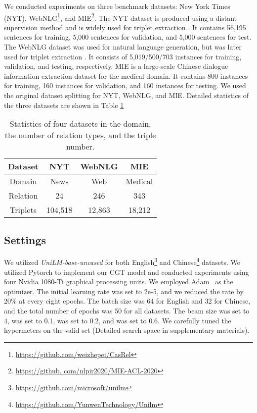\documentclass[letterpaper]{article} \usepackage{aaai21}  \usepackage{times}  \usepackage{helvet} \usepackage{courier}  \usepackage[hyphens]{url}  \usepackage{graphicx} \urlstyle{rm} \def\UrlFont{\rm}  \usepackage{natbib}  \usepackage[noend]{algpseudocode}
\begin{document}
We conducted experiments on three benchmark datasets: New York Times (NYT), WebNLG\footnote{\url{https://github.com/weizhepei/CasRel}}, and MIE\footnote{\url{https://github. com/nlpir2020/MIE-ACL-2020}}. The NYT dataset is produced using a distant supervision method and is widely used for triplet extraction \cite{riedel2010modeling}.  It contains 56,195 sentences for training, 5,000 sentences for validation, and 5,000 sentences for test. The WebNLG dataset \cite{gardent2017creating} was used for natural language generation, but was later used for triplet extraction \cite{zeng2018extracting}. It consists of 5,019/500/703 instances for training, validation, and testing, respectively. MIE \cite{zhang2020mie} is a large-scale Chinese dialogue information extraction dataset for the medical domain. It contains 800 instances for training, 160 instances for validation, and 160 instances for testing. We used the original dataset splitting for NYT, WebNLG, and MIE. Detailed statistics of the three datasets are shown in Table \ref{dataset}
\begin{table}[!htbp]
 
\centering
{
\begin{tabular}{c|ccc}

\toprule
Dataset&NYT&WebNLG&MIE\\
\midrule
Domain&News&Web&Medical\\
Relation&24&246&343\\
Triplets&104,518&12,863&18,212\\
\bottomrule
\end{tabular}
}
\caption{Statistics of four datasets in the domain, the number of relation types, and the triple number.}
\label{dataset}
\end{table}

\subsection{Settings}
We utilized \emph{UniLM-base-uncased} for both English\footnote{\url{https://github.com/microsoft/unilm}} and Chinese\footnote{\url{https://github.com/YunwenTechnology/Unilm}} datasets. We utilized Pytorch  to implement our CGT model and conducted experiments using four Nvidia 1080-Ti graphical processing units. We employed Adam~\cite{kingma2014adam} as the optimizer. The initial learning rate was set to 2e-5, and we reduced the rate by 20\% at every eight epochs. The batch size was 64 for English and 32 for Chinese, and the total number of epochs was 50 for all datasets. The beam size was set to 4,  was set to 0.1,   was set to 0.2, and  was set to 0.6. We carefully tuned the hypermeters on the valid set (Detailed search space in supplementary materials). 
\end{document}
